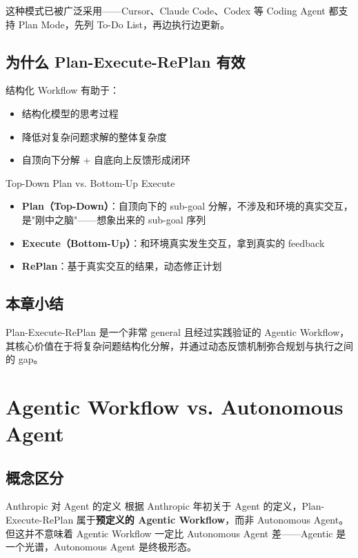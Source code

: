 \documentclass[a4paper]{article}
\begin{document}
这种模式已被广泛采用——Cursor、Claude Code、Codex 等 Coding Agent 都支持 Plan Mode，先列 To-Do List，再边执行边更新。

\subsection{为什么 Plan-Execute-RePlan 有效}

结构化 Workflow 有助于：
\begin{itemize}
    \item 结构化模型的思考过程
    \item 降低对复杂问题求解的整体复杂度
    \item 自顶向下分解 + 自底向上反馈形成闭环
\end{itemize}

\begin{knowledgebox}{Top-Down Plan vs. Bottom-Up Execute}
\begin{itemize}
    \item \textbf{Plan（Top-Down）}：自顶向下的 sub-goal 分解，不涉及和环境的真实交互，是"刚中之脑"——想象出来的 sub-goal 序列
    \item \textbf{Execute（Bottom-Up）}：和环境真实发生交互，拿到真实的 feedback
    \item \textbf{RePlan}：基于真实交互的结果，动态修正计划
\end{itemize}
\end{knowledgebox}

\subsection{本章小结}

Plan-Execute-RePlan 是一个非常 general 且经过实践验证的 Agentic Workflow，其核心价值在于将复杂问题结构化分解，并通过动态反馈机制弥合规划与执行之间的 gap。

\section{Agentic Workflow vs. Autonomous Agent}

\subsection{概念区分}

\begin{knowledgebox}{Anthropic 对 Agent 的定义}
根据 Anthropic 年初关于 Agent 的定义，Plan-Execute-RePlan 属于\textbf{预定义的 Agentic Workflow}，而非 Autonomous Agent。但这并不意味着 Agentic Workflow 一定比 Autonomous Agent 差——Agentic 是一个光谱，Autonomous Agent 是终极形态。
\end{knowledgebox}
\end{document}

